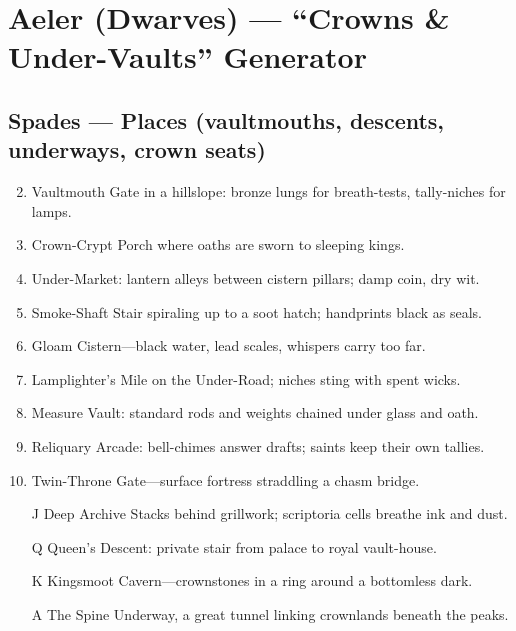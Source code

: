 \chapter{Aeler (Dwarves) --- ``Crowns \& Under-Vaults'' Generator}
\label{chap:aeler}

\section*{Spades --- Places (vaultmouths, descents, underways, crown seats)}
\label{sec:aeler-places}
\begin{enumerate}
\setcounter{enumi}{1}
\item Vaultmouth Gate in a hillslope: bronze lungs for breath-tests, tally-niches for lamps.
\item Crown-Crypt Porch where oaths are sworn to sleeping kings.
\item Under-Market: lantern alleys between cistern pillars; damp coin, dry wit.
\item Smoke-Shaft Stair spiraling up to a soot hatch; handprints black as seals.
\item Gloam Cistern---black water, lead scales, whispers carry too far.
\item Lamplighter's Mile on the Under-Road; niches sting with spent wicks.
\item Measure Vault: standard rods and weights chained under glass and oath.
\item Reliquary Arcade: bell-chimes answer drafts; saints keep their own tallies.
\item Twin-Throne Gate---surface fortress straddling a chasm bridge.
\item[J] Deep Archive Stacks behind grillwork; scriptoria cells breathe ink and dust.
\item[Q] Queen's Descent: private stair from palace to royal vault-house.
\item[K] Kingsmoot Cavern---crownstones in a ring around a bottomless dark.
\item[A] The Spine Underway, a great tunnel linking crownlands beneath the peaks.
\end{enumerate}

